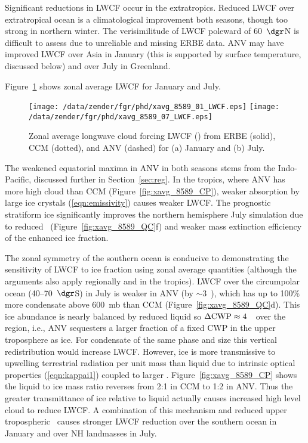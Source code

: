\documentclass[agums]{aguplus}
\begin{document}
Significant reductions in LWCF occur in the extratropics.
Reduced LWCF over extratropical ocean is a climatological
improvement both seasons, though too strong in northern winter.
The verisimilitude of LWCF poleward of 60~$\dgr$N is difficult to
assess due to unreliable and missing ERBE data.
ANV may have improved LWCF over Asia in January (this is supported by
surface temperature, discussed below) and over July in Greenland.

Figure~\ref{fig:xavg_8589_LWCF} shows zonal average LWCF for January
and July. 
\begin{figure}
\begin{center}
\texttt{[image: /data/zender/fgr/phd/xavg\_8589\_01\_LWCF.eps]}\vfill
\texttt{[image: /data/zender/fgr/phd/xavg\_8589\_07\_LWCF.eps]}\vfill
\end{center}
\caption[Zonal average longwave cloud forcing LWCF from ERBE,
CCM, and ANV for January and July]{
Zonal average longwave cloud forcing LWCF (\wxmS) from ERBE
(solid), CCM (dotted), and ANV (dashed) for (a) January and (b) July.
\label{fig:xavg_8589_LWCF}}   
\end{figure}
The weakened equatorial maxima in ANV in both seasons stems from the
Indo-Pacific, discussed further in Section~\ref{sec:reg}.
In the tropics, where ANV has more high cloud than CCM
(Figure~\ref{fig:xavg_8589_CP}), weaker absorption by large ice
crystals (\ref{eqn:emissivity}) causes weaker LWCF. 
The prognostic stratiform ice significantly improves the northern
hemisphere July simulation due to reduced \qc\
(Figure~\ref{fig:xavg_8589_QC}f) and weaker mass extinction efficiency
of the enhanced ice fraction. 

The zonal symmetry of the southern ocean is conducive to demonstrating
the sensitivity of LWCF to ice fraction using zonal average quantities
(although the arguments also apply regionally and in the tropics). 
LWCF over the circumpolar ocean (40--70~$\dgr$S) in July is weaker
in ANV (by $\sim 3$~\wxmS), which has up to 100\% more condensate
above 600~mb than CCM (Figure~\ref{fig:xavg_8589_QC}d).
This ice abundance is nearly balanced by reduced liquid so $\Delta \mbox{\textrm{CWP}}
\approx 4$~\gxmS\ over the region, i.e., ANV sequesters a larger
fraction of a fixed CWP in the upper troposphere as ice. 
For condensate of the same phase and size this vertical redistribution
would increase LWCF.
However, ice is more transmissive to upwelling terrestrial radiation
per unit mass than liquid due to intrinsic optical properties
(\ref{eqn:kappai1}) coupled to larger \rdsffc.
Figure~\ref{fig:xavg_8589_CP} shows the liquid to ice mass
ratio reverses from 2:1 in CCM to 1:2 in ANV.
Thus the greater transmittance of ice relative to liquid actually
causes increased high level cloud to reduce LWCF.
A combination of this mechanism and reduced upper tropospheric \qc\
causes stronger LWCF reduction over the southern ocean in January
and over NH landmasses in July.
\end{document}
